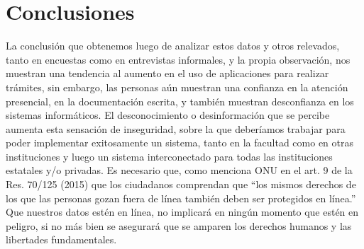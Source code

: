 \documentclass[a4paper]{article}
\begin{document}




\section{Conclusiones}

La conclusión que obtenemos luego de analizar estos datos y otros relevados, tanto en encuestas como en entrevistas informales, y la propia observación, nos muestran una tendencia al aumento en el uso de aplicaciones para realizar trámites, sin embargo, las personas aún muestran una confianza en la atención presencial, en la documentación escrita, y también muestran desconfianza en los sistemas informáticos. El desconocimiento o desinformación que se percibe aumenta esta sensación de inseguridad, sobre la que deberíamos trabajar para poder implementar exitosamente un sistema, tanto en la facultad como en otras instituciones y luego un sistema interconectado para todas las instituciones estatales y/o privadas. Es necesario que, como menciona ONU en el art. 9 de la Res. 70/125  (2015) que los ciudadanos comprendan que “los mismos derechos de los que las personas gozan fuera de línea también deben ser protegidos en línea.” Que nuestros datos estén en línea, no implicará en ningún momento que estén en peligro, si no más bien se asegurará que se amparen los derechos humanos y las libertades fundamentales. 
\end{document}
